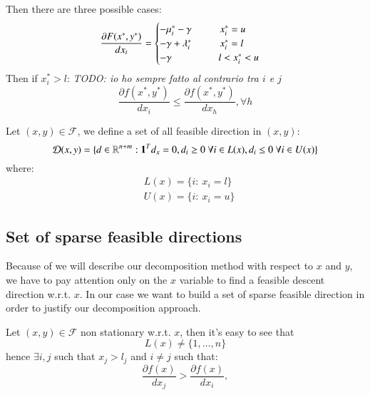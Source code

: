 Then there are three possible cases:
\begin{equation}
 \frac{\partial F(x^*,y^*)}{dx_i} = \begin{cases} -\mu_i^* -\gamma \hspace{1cm} x^*_i =u \\
 -\gamma+\lambda^*_i \hspace{1cm} x^*_i =l \\
 -\gamma \hspace{1.65cm} l<x^*_i <u 
\end{cases}
\end{equation}
Then if $x^*_i>l$: \textit{TODO: io ho sempre fatto al contrario tra $i$ e $j$}
\begin{equation}
 \frac{\partial f(x^*,y^*)}{dx_i} \le \frac{\partial f(x^*,y^*)}{dx_h}, \forall h
\end{equation}

Let $(x,y) \in \mathcal{F}$, we define a set of all feasible direction in $(x,y)$:
\begin{equation}
 \mathcal{D}(x,y)=\{ d \in \mathbb{R}^{n+m}: \mathbf{1}^Td_x=0, d_i\ge 0 \ \forall i \in L(x), d_i\le 0 \ \forall i \in U(x)\}
\end{equation}
where:
\begin{equation}
 \begin{aligned}
  &L(x)=\{ i: \ x_i=l\}\\
  &U(x)=\{ i: \ x_i=u\}
 \end{aligned}
\end{equation}



\subsection{Set of sparse feasible directions}
Because of we will describe our decomposition method with respect to $x$ and $y$, we have to pay attention only on the $x$ variable to find a feasible descent direction w.r.t. $x$. 
In our case we want to build a set of sparse feasible direction in order to justify our decomposition approach.

Let $(x,y) \in \mathcal{F}$ non stationary w.r.t. $x$, then it's easy to see that
\begin{equation}
 L(x)\ne \{1,\ldots,n\}
\end{equation}
hence $\exists i,j$ such that $x_j>l_j$ and $i \ne j$ such that:
\begin{equation}
 \frac{\partial f(x)}{dx_j} > \frac{\partial f(x)}{dx_i}, 
\end{equation}

